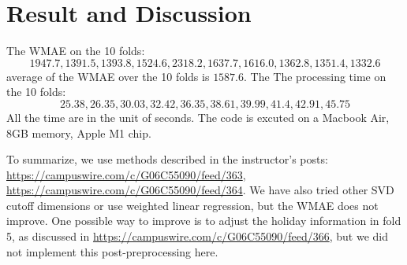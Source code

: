 \documentclass[12pt]{article}
\theoremstyle{plain}
\begin{document}
\section{Result and Discussion}
The WMAE on the 10 folds: 
\begin{equation}
1947.7, 1391.5, 1393.8, 1524.6, 2318.2, 1637.7, 1616.0, 1362.8, 1351.4, 1332.6
\end{equation}
average of the WMAE over the 10 folds is $1587.6$. The The processing time on the 10 folds:
\begin{equation}
25.38, 26.35, 30.03, 32.42, 36.35, 38.61, 39.99, 41.4, 42.91, 45.75
\end{equation}
All the time are in the unit of seconds. The code is excuted on a Macbook Air, 8GB memory, Apple M1 chip.

To summarize, we use methods described in the instructor's posts: \url{https://campuswire.com/c/G06C55090/feed/363}, \url{https://campuswire.com/c/G06C55090/feed/364}. We have also tried other SVD cutoff dimensions or use weighted linear regression, but the WMAE does not improve. One possible way to improve is to adjust the holiday information in fold 5, as discussed in \url{https://campuswire.com/c/G06C55090/feed/366}, but we did not implement this post-preprocessing here.
\end{document}

